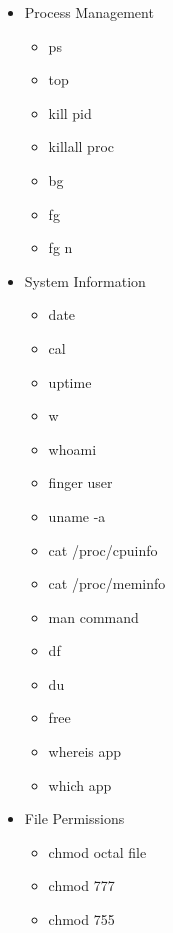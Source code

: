 \documentclass{article}
\begin{document}
\begin{itemize}
\begin{itemize}
				\item ls -al \\
					display all files including hidden file + details 
				\item cd dir
				\item cd
				\item pwd
				\item mkdir dir
				\item rm file 
				\item rm -r dir
				\item rm -f file
				\item rm -rf dir
				\item cp file1 file2
				\item cp -r dir1 dir2
				\item mv file1 file2
				\item ln -s file link
				\item touch file
				\item cat {$>$} file
				\item more file
				\item head file
				\item tail file
				\item tail -f file 
			\end{itemize}
		\item Process Management
			\begin{itemize}
				\item ps 
				\item top
				\item kill pid
				\item killall proc
				\item bg
				\item fg
				\item fg n
			\end{itemize}
		\item System Information
			\begin{itemize}
				\item date
				\item cal
				\item uptime
				\item w
				\item whoami
				\item finger user
				\item uname -a
				\item cat /proc/cpuinfo
				\item cat /proc/meminfo
				\item man command
				\item df
				\item du
				\item free
				\item whereis app
				\item which app
			\end{itemize}
		\item File Permissions
			\begin{itemize}
				\item chmod octal file
				\item chmod 777
				\item chmod 755
			\end{itemize}
	\end{itemize}
\end{document}
